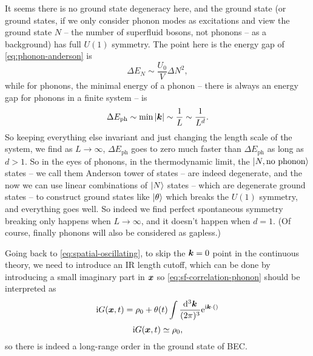 \documentclass[hyperref, a4paper]{article}
\newcommand*{\ii}{\mathrm{i}}
\newcommand*{\ee}{\mathrm{e}}
\begin{document}
\begin{enumerate}
It seems there is no ground state degeneracy here,
and the ground state 
(or ground states, 
if we only consider phonon modes as excitations and view the ground state $N$ 
-- the number of superfluid bosons, not phonons -- as a background) 
has full $U(1)$ symmetry.
The point here is the energy gap of \eqref{eq:phonon-anderson} is 
\begin{equation}
    \Delta E_N \sim \frac{U_0}{V} \Delta N^2,
\end{equation} 
while for phonons, the minimal energy of a phonon 
-- there is always an energy gap for phonons in a finite system -- 
is 
\begin{equation}
    \Delta E_{\text{ph}} \sim \min \abs{\vb*{k}} \sim \frac{1}{L} \sim \frac{1}{L^d}.
\end{equation}
So keeping everything else invariant and just changing the length scale of the system, 
we find as $L \to \infty$,
$\Delta E_\text{ph}$ goes to zero much faster than $\Delta E_{\text{ph}}$
as long as $d > 1$.
So in the eyes of phonons, 
in the thermodynamic limit, 
the $\ket{N, \text{no phonon}}$ states -- we call them Anderson tower of states -- are indeed degenerate,
and the now we can use linear combinations of $\ket{N}$ states -- which are degenerate ground states -- 
to construct ground states like $\ket{\theta}$ which breaks the $U(1)$ symmetry,
and everything goes well.
So indeed we find perfect spontaneous symmetry breaking only happens when $L \to \infty$,
and it doesn't happen when $d = 1$.
(Of course, finally phonons will also be considered as gapless.)

Going back to \eqref{eq:spatial-oscillating}, 
to skip the $\vb*{k} = 0$ point in the continuous theory,
we need to introduce an IR length cutoff, 
which can be done by introducing a small imaginary part in $\vb*{x}$
so \eqref{eq:sf-correlation-phonon} should be interpreted as 
\begin{equation}
    \ii G(\vb*{x}, t) = \rho_0 + \theta(t) \int \frac{\dd[3]{\vb*{k}}}{(2\pi)^3} \ee^{\ii \vb*{k} \cdot ()}
\end{equation}
\begin{equation}
    \ii G(\vb*{x}, t) \simeq \rho_0,
\end{equation}
so there is indeed a long-range order in the ground state of BEC.


\end{enumerate}
\end{document}
